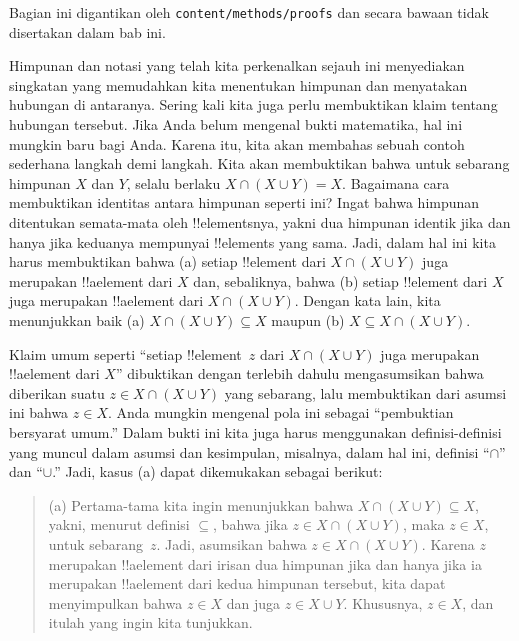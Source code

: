 \documentclass[../../../include/open-logic-section]{subfiles}
\begin{document}

\begin{editorial}
Bagian ini digantikan oleh \verb|content/methods/proofs| dan secara bawaan
tidak disertakan dalam bab ini.
\end{editorial}

\begin{explain}
Himpunan dan notasi yang telah kita perkenalkan sejauh ini menyediakan
singkatan yang memudahkan kita menentukan himpunan dan menyatakan hubungan
di antaranya. Sering kali kita juga perlu membuktikan klaim tentang
hubungan tersebut. Jika Anda belum mengenal bukti matematika, hal ini
mungkin baru bagi Anda. Karena itu, kita akan membahas sebuah contoh
sederhana langkah demi langkah. Kita akan membuktikan bahwa untuk sebarang
himpunan $X$ dan $Y$, selalu berlaku $X \cap (X \cup Y) = X$. Bagaimana
cara membuktikan identitas antara himpunan seperti ini? Ingat bahwa
himpunan ditentukan semata-mata oleh !!{element}snya, yakni dua himpunan
identik jika dan hanya jika keduanya mempunyai !!{element}s yang sama.
Jadi, dalam hal ini kita harus membuktikan bahwa (a) setiap !!{element}
dari $X \cap (X \cup Y)$ juga merupakan !!a{element} dari $X$ dan,
sebaliknya, bahwa (b) setiap !!{element} dari $X$ juga merupakan
!!a{element} dari $X \cap (X \cup Y)$. Dengan kata lain, kita menunjukkan
baik (a) $X \cap (X \cup Y) \subseteq X$ maupun (b) $X \subseteq X \cap
(X \cup Y)$.

Klaim umum seperti ``setiap !!{element}~$z$ dari $X \cap (X \cup Y)$ juga
merupakan !!a{element} dari $X$'' dibuktikan dengan terlebih dahulu
mengasumsikan bahwa diberikan suatu $z \in X \cap (X \cup Y)$ yang
sebarang, lalu membuktikan dari asumsi ini bahwa $z \in X$. Anda mungkin
mengenal pola ini sebagai ``pembuktian bersyarat umum.'' Dalam bukti ini
kita juga harus menggunakan definisi-definisi yang muncul dalam asumsi dan
kesimpulan, misalnya, dalam hal ini, definisi ``$\cap$'' dan ``$\cup$.''
Jadi, kasus (a) dapat dikemukakan sebagai berikut:

\begin{quote}
(a) Pertama-tama kita ingin menunjukkan bahwa $X \cap (X \cup Y) \subseteq
X$, yakni, menurut definisi $\subseteq$, bahwa jika $z \in X \cap (X \cup
Y)$, maka $z \in X$, untuk sebarang~$z$. Jadi, asumsikan bahwa $z \in X
\cap (X \cup Y)$. Karena $z$ merupakan !!a{element} dari irisan dua
himpunan jika dan hanya jika ia merupakan !!a{element} dari kedua himpunan
tersebut, kita dapat menyimpulkan bahwa $z \in X$ dan juga $z \in X \cup
Y$. Khususnya, $z \in X$, dan itulah yang ingin kita tunjukkan.
\end{quote}


\end{explain}
\end{document}
